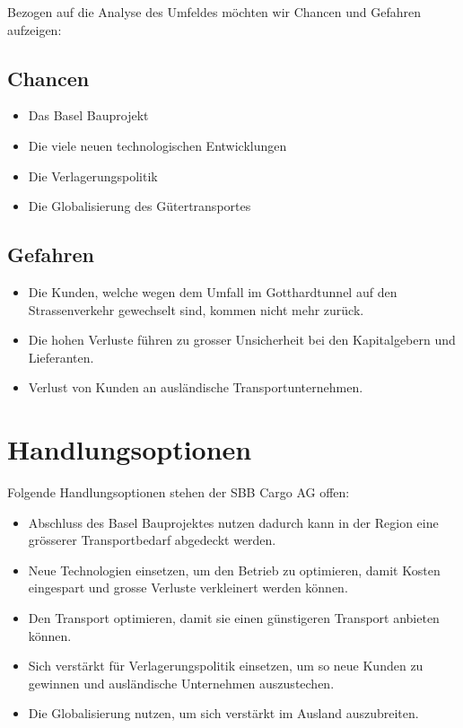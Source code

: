 \documentclass{article}
\begin{document}
Bezogen auf die Analyse des Umfeldes möchten wir Chancen und Gefahren aufzeigen:

\subsection{Chancen}
\begin{itemize}
    \item Das Basel Bauprojekt
    \item Die viele neuen technologischen Entwicklungen
    \item Die Verlagerungspolitik
    \item Die Globalisierung des Gütertransportes
\end{itemize}
\subsection{Gefahren}
\begin{itemize}
    \item Die Kunden, welche wegen dem Umfall im Gotthardtunnel auf den Strassenverkehr gewechselt sind, kommen nicht mehr zurück.
    \item Die hohen Verluste führen zu grosser Unsicherheit bei den Kapitalgebern und Lieferanten.
    \item Verlust von Kunden an ausländische Transportunternehmen.
\end{itemize}

\section{Handlungsoptionen}

Folgende Handlungsoptionen stehen der SBB Cargo AG offen:

\begin{itemize}
    \item Abschluss des Basel Bauprojektes nutzen dadurch kann in der Region eine grösserer Transportbedarf abgedeckt werden. 
    \item Neue Technologien einsetzen, um den Betrieb zu optimieren, damit Kosten eingespart und grosse Verluste verkleinert werden können. 
    \item Den Transport optimieren, damit sie einen günstigeren Transport anbieten können. 
    \item Sich verstärkt für Verlagerungspolitik einsetzen, um so neue Kunden zu gewinnen und ausländische Unternehmen auszustechen. 
    \item Die Globalisierung nutzen, um sich verstärkt im Ausland auszubreiten. 
\end{itemize}
\end{document}
